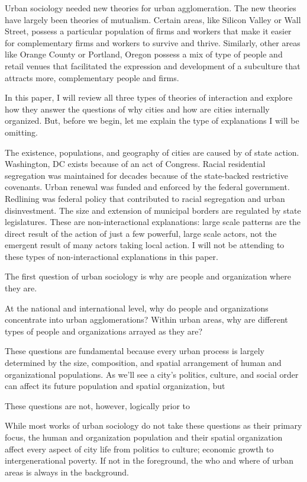 Urban sociology needed new theories for urban agglomeration. The new
theories have largely been theories of mutualism. Certain areas, like
Silicon Valley or Wall Street, possess a particular population of
firms and workers that make it easier for complementary firms and
workers to survive and thrive. Similarly, other areas like Orange
County or Portland, Oregon possess a mix of type of people and retail
venues that facilitated the expression and development of a subculture
that attracts more, complementary people and firms.

In this paper, I will review all three types of theories of
interaction and explore how they answer the questions of why cities
and how are cities internally organized. But, before we begin, let me
explain the type of explanations I will be omitting. 

The existence, populations, and geography of cities are caused by of
state action. Washington, DC exists because of an act of
Congress. Racial residential segregation was maintained for decades
because of the state-backed restrictive covenants. Urban renewal was
funded and enforced by the federal government. Redlining was federal
policy that contributed to racial segregation and urban
disinvestment. The size and extension of municipal borders are
regulated by state legislatures. These are non-interactional
explanations: large scale patterns are the direct result of the action
of just a few powerful, large scale actors, not the emergent result of
many actors taking local action. I will not be attending to these
types of non-interactional explanations in this paper.





The first question of urban sociology is why are people and
organization where they are. 


At the national and international level,
why do people and organizations concentrate into urban
agglomerations? Within urban areas, why are different types of people
and organizations arrayed as they are?

These questions are fundamental because every urban process is largely
determined by the size, composition, and spatial arrangement of human
and organizational populations. As we'll see a city's politics,
culture, and social order can affect its future population and spatial
organization, but


These questions are not, however,
logically prior to 

While most works of urban sociology do not take these questions as
their primary focus, the human and organization population and their
spatial organization affect every aspect of city life from politics to
culture; economic growth to intergenerational poverty. If not in the
foreground, the who and where of urban areas is always in the background.

